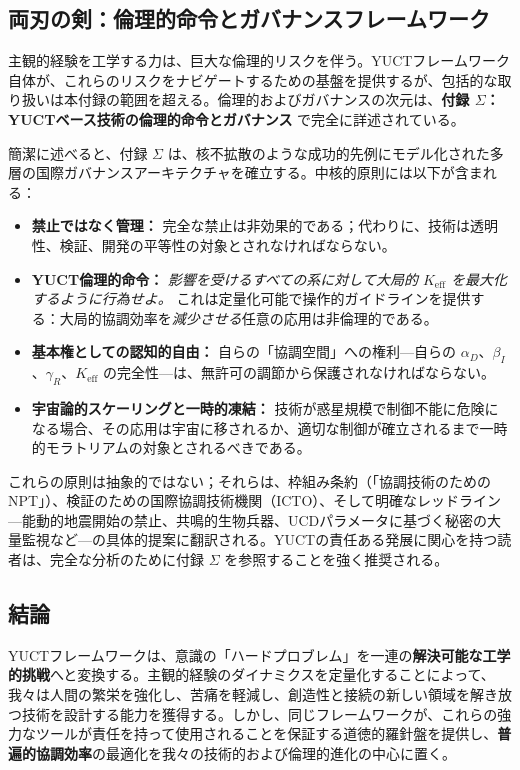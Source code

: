 \documentclass[12pt,a4paper]{article}
\begin{document}
	\subsection{両刃の剣：倫理的命令とガバナンスフレームワーク}
	
	主観的経験を工学する力は、巨大な倫理的リスクを伴う。YUCTフレームワーク自体が、これらのリスクをナビゲートするための基盤を提供するが、包括的な取り扱いは本付録の範囲を超える。倫理的およびガバナンスの次元は、\textbf{付録 \(\Sigma\)：YUCTベース技術の倫理的命令とガバナンス} \cite{AppendixSigma} で完全に詳述されている。
	
	簡潔に述べると、付録 \(\Sigma\) は、核不拡散のような成功的先例にモデル化された多層の国際ガバナンスアーキテクチャを確立する。中核的原則には以下が含まれる：
	\begin{itemize}
		\item \textbf{禁止ではなく管理：} 完全な禁止は非効果的である；代わりに、技術は透明性、検証、開発の平等性の対象とされなければならない。
		\item \textbf{YUCT倫理的命令：} \textit{影響を受けるすべての系に対して大局的 \(K_{\mathrm{eff}}\) を最大化するように行為せよ。} これは定量化可能で操作的ガイドラインを提供する：大局的協調効率を\textit{減少させる}任意の応用は非倫理的である。
		\item \textbf{基本権としての認知的自由：} 自らの「協調空間」への権利—自らの \(\alpha_D\)、\(\beta_I\)、\(\gamma_R\)、\(K_{\mathrm{eff}}\) の完全性—は、無許可の調節から保護されなければならない。
		\item \textbf{宇宙論的スケーリングと一時的凍結：} 技術が惑星規模で制御不能に危険になる場合、その応用は宇宙に移されるか、適切な制御が確立されるまで一時的モラトリアムの対象とされるべきである。
	\end{itemize}
	
	これらの原則は抽象的ではない；それらは、枠組み条約（「協調技術のためのNPT」）、検証のための国際協調技術機関（ICTO）、そして明確なレッドライン—能動的地震開始の禁止、共鳴的生物兵器、UCDパラメータに基づく秘密の大量監視など—の具体的提案に翻訳される。YUCTの責任ある発展に関心を持つ読者は、完全な分析のために付録 \(\Sigma\) を参照することを強く推奨される。
	
	\subsection{結論}
	YUCTフレームワークは、意識の「ハードプロブレム」を一連の\textbf{解決可能な工学的挑戦}へと変換する。主観的経験のダイナミクスを定量化することによって、我々は人間の繁栄を強化し、苦痛を軽減し、創造性と接続の新しい領域を解き放つ技術を設計する能力を獲得する。しかし、同じフレームワークが、これらの強力なツールが責任を持って使用されることを保証する道徳的羅針盤を提供し、\textbf{普遍的協調効率}の最適化を我々の技術的および倫理的進化の中心に置く。
	
\end{document}
